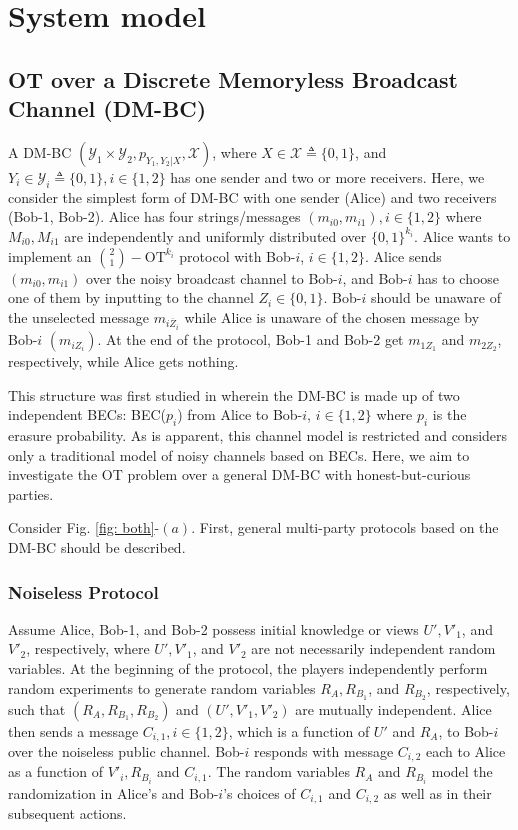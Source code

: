 \documentclass[runningheads]{llncs}
\newcommand{\parbreak}{ \vspace{0.3 em}}
\newcounter{protocol}
\begin{document}
\section{System model}\label{Sec: sys}
\subsection{OT over a Discrete Memoryless Broadcast Channel (DM-BC)}
A DM-BC $(\mathcal{Y}_1\times \mathcal{Y}_2, p_{Y_1,Y_2|X}, \mathcal{X})$, where $X\in\mathcal{X}\triangleq \{0,1\}$, and $Y_i\in\mathcal{Y}_i\triangleq\{0,1\}, i\in\{1,2\}$ has one sender and two or more receivers. Here, we consider the simplest form of DM-BC with one sender (Alice) and two receivers (Bob-1, Bob-2). Alice has four strings/messages $(m_{i0},m_{i1}), i\in \{1,2\}$ where $M_{i0},M_{i1}$ are independently and uniformly distributed over $\{0,1\}^{k_i}$. Alice wants to implement an $\binom{2}{1}-\text{OT}^{k_i}$ protocol with Bob-$i$, $i\in\{1,2\}$. Alice sends $(m_{i0},m_{i1})$ over the noisy broadcast channel to Bob-$i$, and Bob-$i$ has to choose one of them by inputting to the channel $Z_i\in\{0,1\}$. Bob-$i$ should be unaware of the unselected message $m_{i\overline{Z}_i}$ while Alice is unaware of the chosen message by Bob-$i$ $(m_{iZ_i})$. At the end of the protocol, Bob-1 and Bob-2 get $m_{1Z_1}$ and $m_{2Z_2}$, respectively, while Alice gets nothing.

\parbreak 
This structure was first studied in \cite{mishra} wherein the DM-BC is made up of two independent BECs: BEC($p_i$) from Alice to Bob-$i$, $i\in\{1,2\}$ where $p_i$ is the erasure probability. As is apparent, this channel model is restricted and considers only a traditional model of noisy channels based on BECs. Here, we aim to investigate the OT problem over a general DM-BC with honest-but-curious parties. 

\parbreak Consider Fig. \ref{fig: both}-$(a)$. First, general multi-party protocols based on the DM-BC should be described. 

\subsubsection{Noiseless Protocol}

\parbreak Assume Alice, Bob-1, and Bob-2 possess initial knowledge or views $U', V'_1$, and $V'_2$, respectively, where $U', V'_1$, and $V'_2$ are not necessarily independent random variables. At the beginning of the protocol, the players independently perform random experiments to generate random variables $R_{A}, R_{B_1}$, and $R_{B_2}$, respectively, such that $(R_{A}, R_{B_1}, R_{B_2})$ and $(U', V'_1, V'_2)$ are mutually independent. Alice then sends a message $C_{i,1},i\in\{1,2\}$, which is a function of $U'$ and $R_{A}$, to Bob-$i$ over the noiseless public channel. Bob-$i$ responds with message $C_{i,2}$ each to Alice as a function of $V'_i, R_{B_i}$ and $C_{i,1}$. The random variables $R_{A}$ and $R_{B_i}$ model the randomization in Alice's and Bob-$i$'s choices of $C_{i,1}$ and $C_{i,2}$ as well as in their subsequent actions. 
\end{document}
